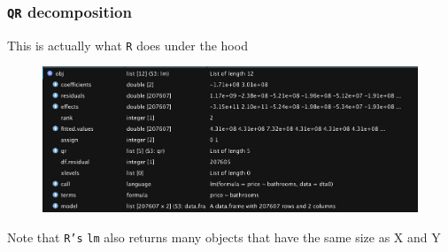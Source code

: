 \documentclass[
  shownotes,
  xcolor={svgnames},
  hyperref={colorlinks,citecolor=DarkBlue,linkcolor=DarkRed,urlcolor=DarkBlue}
  , aspectratio=169]{beamer}
\begin{document}
\begin{frame}[fragile]
\frametitle{\texttt{QR} decomposition}
This is actually what \texttt{R} does under the hood


\begin{figure}[H] \centering
  \centering
  \includegraphics[scale=0.45]{figures/lm_object.png}
  \\
  \tiny 
\end{figure}


Note that \texttt{R's} \texttt{lm} also returns many objects that have the same size as X and Y

\end{frame}



\end{document}
